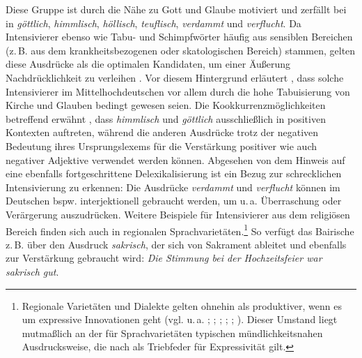 Diese Gruppe ist durch die Nähe zu Gott und Glaube motiviert und zerfällt bei \citet[359]{Claudi.2006} in \textit{göttlich}, \textit{himmlisch}, \textit{höllisch}, \textit{teuflisch}, \textit{verdammt} und \textit{verflucht}. Da Intensivierer ebenso wie Tabu- und Schimpfwörter häufig aus sensiblen Bereichen (z.\,B. aus dem krankheitsbezogenen oder skatologischen Bereich) stammen, gelten diese Ausdrücke als die optimalen Kandidaten, um einer Äußerung Nachdrücklichkeit zu verleihen {\citep[vgl.][189]{Kirschbaum.2002b}}. Vor diesem Hintergrund erläutert {\citet[83]{Klara.2009}}, dass solche Intensivierer im Mittelhochdeutschen vor allem durch die \glqq{}hohe Tabuisierung von Kirche und Glauben\grqq{} bedingt gewesen seien. Die Kookkurrenzmöglichkeiten betreffend erwähnt {\citet[359]{Claudi.2006}}, dass \textit{himmlisch} und \textit{göttlich} ausschließlich in positiven Kontexten auftreten, während die anderen Ausdrücke trotz der negativen Bedeutung ihres Ursprungslexems für die Verstärkung positiver wie auch negativer Adjektive verwendet werden können. Abgesehen von dem Hinweis auf eine ebenfalls fortgeschrittene Delexikalisierung ist ein Bezug zur \glqq{}schrecklichen\grqq{} Intensivierung zu erkennen: Die Ausdrücke \textit{verdammt} und \textit{verflucht} können im Deutschen bspw. interjektionell gebraucht werden, um u.\,a. Überraschung oder Verärgerung auszudrücken. Weitere Beispiele für Intensivierer aus dem religiösen Bereich finden sich auch in regionalen Sprachvarietäten.\footnote{Regionale Varietäten und Dialekte gelten ohnehin als produktiver, wenn es um expressive Innovationen geht (vgl. u.\,a. \citealt[60]{Tobler.1868}; \citealt[2]{Hauschild.1899}; \citealt[266]{Hauschild.1929}; \citealt[293]{Bach.1950}; {\citealt[32ff.]{Henzen.1954}}; {\citealt[90]{Klara.2009}}). Dieser Umstand liegt mutmaßlich an der für Sprachvarietäten typischen mündlichkeitsnahen Ausdrucksweise, die nach {\citet[89]{Koch.1996}} als Triebfeder für Expressivität gilt.} So verfügt das Bairische z.\,B. über den Ausdruck \textit{sakrisch}, der sich von Sakrament ableitet und ebenfalls zur Verstärkung gebraucht wird: \textit{Die Stimmung bei der Hochzeitsfeier war {sakrisch gut}}.


